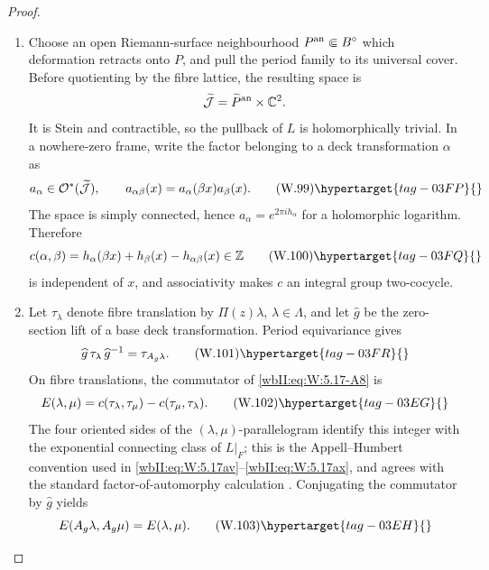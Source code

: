 \begin{proof}

\begin{enumerate}[label={$\langle1\rangle$\arabic*.},leftmargin=*]
\item Choose an open Riemann-surface neighbourhood \(P^{\rm an}\Subset B^\circ\)
which deformation retracts onto \(P\), and pull the period family to its
universal cover.  Before quotienting by the fibre lattice, the resulting
space is
\[
 \widetilde{\mathcal J}
 =\widetilde P^{\rm an}\times\mathbb C^2.
\]
It is Stein and contractible, so the pullback of \(L\) is holomorphically
trivial.  In a nowhere-zero frame, write the factor belonging to a deck
transformation \(\alpha\) as
\[
 a_\alpha\in\mathcal O^*(\widetilde{\mathcal J}),
 \qquad
 a_{\alpha\beta}(x)=a_\alpha(\beta x)a_\beta(x).
\tag{W.99}\hypertarget{tag-03FP}{}\label{wbII:eq:W:5.17-A7}
\]
The space is simply connected, hence \(a_\alpha=e^{2\pi i h_\alpha}\) for
a holomorphic logarithm.  Therefore
\[
 c(\alpha,\beta)
 =h_\alpha(\beta x)+h_\beta(x)-h_{\alpha\beta}(x)\in\mathbb Z
\tag{W.100}\hypertarget{tag-03FQ}{}\label{wbII:eq:W:5.17-A8}
\]
is independent of \(x\), and associativity makes \(c\) an integral group
two-cocycle.

\item Let \(\tau_\lambda\) denote fibre translation by
\(\Pi(z)\lambda\), \(\lambda\in\Lambda\), and let \(\widehat g\) be the
zero-section lift of a base deck transformation.  Period equivariance gives
\[
 \widehat g\,\tau_\lambda\,\widehat g^{-1}
 =\tau_{A_g\lambda}.
\tag{W.101}\hypertarget{tag-03FR}{}\label{wbII:eq:W:5.17-A9}
\]
On fibre translations, the commutator of \eqref{wbII:eq:W:5.17-A8} is
\[
 E(\lambda,\mu)
 =c(\tau_\lambda,\tau_\mu)-c(\tau_\mu,\tau_\lambda).
\tag{W.102}\hypertarget{tag-03EG}{}\label{wbII:eq:W:5.17-A10}
\]
The four oriented sides of the \((\lambda,\mu)\)-parallelogram identify
this integer with the exponential connecting class of \(L|_F\); this is
the Appell--Humbert convention used in
\eqref{wbII:eq:W:5.17av}--\eqref{wbII:eq:W:5.17ax}, and agrees with the standard factor-of-automorphy
calculation \cite[Chapter~1, \S2, pp.~5--8, especially
Theorem~2.1, p.~7]{BirkenhakeLange1999}%
\cite[equations~(3.3)--(3.10), pp.~3--7]{SchnellLecture3}.
Conjugating the commutator by \(\widehat g\) yields
\[
 E(A_g\lambda,A_g\mu)=E(\lambda,\mu).
\tag{W.103}\hypertarget{tag-03EH}{}\label{wbII:eq:W:5.17-A11}
\]


\end{enumerate}
\end{proof}
